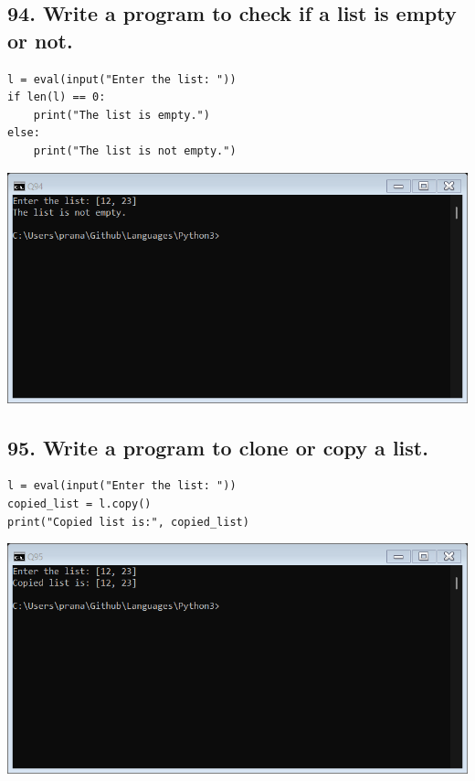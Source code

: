 \documentclass[12pt]{article}
\begin{document}
\subsection*{94. Write a program to check if a list is empty or not.}
\begin{verbatim}
l = eval(input("Enter the list: "))
if len(l) == 0:
    print("The list is empty.")
else:
    print("The list is not empty.")
\end{verbatim}
\includegraphics[width=\linewidth]{images/94.png}

\subsection*{95. Write a program to clone or copy a list.}
\begin{verbatim}
l = eval(input("Enter the list: "))
copied_list = l.copy()
print("Copied list is:", copied_list)
\end{verbatim}
\includegraphics[width=\linewidth]{images/95.png}
\end{document}
